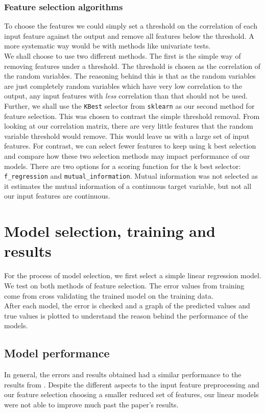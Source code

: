 \documentclass{article}
\newcommand{\n}[0]{\\[\baselineskip]}
\begin{document}
\subsubsection{Feature selection algorithms}
To choose the features we could simply set a threshold on the correlation of each input feature against the output and remove all features below the threshold. A more systematic way would be with methods like univariate tests.
\n
We shall choose to use two different methods. The first is the simple way of removing features under a threshold. The threshold is chosen as the correlation of the random variables. The reasoning behind this is that as the random variables are just completely random variables which have very low correlation to the output, any input features with \textit{less} correlation than that should not be used. Further, we shall use the \texttt{KBest} selector from \texttt{sklearn} as our second method for feature selection. This was chosen to contrast the simple threshold removal. From looking at our correlation matrix, there are very little features that the random variable threshold would remove. This would leave us with a large set of input features. For contrast, we can select fewer features to keep using k best selection and compare how these two selection methods may impact performance of our models. There are two options for a scoring function for the k best selector: \texttt{f\_regression} and \texttt{mutual\_information}. Mutual information was not selected as it estimates the mutual information of a continuous target variable, but not all our input features are continuous. 

\section{Model selection, training and results}
For the process of model selection, we first select a simple linear regression model. We test on both methods of feature selection. The error values from training come from cross validating the trained model on the training data.
\n
After each model, the error is checked and a graph of the predicted values and true values is plotted to understand the reason behind the performance of the models.

\subsection{Model performance}
In general, the errors and results obtained had a similar performance to the results from \cite{paper}. Despite the different aspects to the input feature preprocessing and our feature selection choosing a smaller reduced set of features, our linear models were not able to improve much past the paper's results. 
\end{document}
